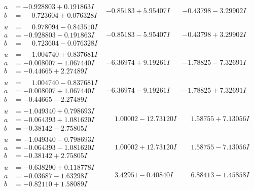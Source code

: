 \documentclass[1p]{elsarticle_modified}
\theoremstyle{definition}
\begin{document}
$$\begin{array}{c|c|c}
\begin{aligned}
a &= -0.928803 + 0.191863 I \\
b &= \phantom{-}0.723604 + 0.076328 I\end{aligned}
 & -0.85183 + 5.95407 I & -0.43798 - 3.29902 I \\ \hline\begin{aligned}
u &= \phantom{-}0.978094 - 0.843510 I \\
a &= -0.928803 - 0.191863 I \\
b &= \phantom{-}0.723604 - 0.076328 I\end{aligned}
 & -0.85183 - 5.95407 I & -0.43798 + 3.29902 I \\ \hline\begin{aligned}
u &= \phantom{-}1.004740 + 0.837681 I \\
a &= -0.008007 - 1.067440 I \\
b &= -0.44665 + 2.27489 I\end{aligned}
 & -6.36974 + 9.19261 I & -1.78825 - 7.32691 I \\ \hline\begin{aligned}
u &= \phantom{-}1.004740 - 0.837681 I \\
a &= -0.008007 + 1.067440 I \\
b &= -0.44665 - 2.27489 I\end{aligned}
 & -6.36974 - 9.19261 I & -1.78825 + 7.32691 I \\ \hline\begin{aligned}
u &= -1.049340 + 0.798693 I \\
a &= -0.064393 + 1.081620 I \\
b &= -0.38142 - 2.75805 I\end{aligned}
 & \phantom{-}1.00002 - 12.73120 I & \phantom{-}1.58755 + 7.13056 I \\ \hline\begin{aligned}
u &= -1.049340 - 0.798693 I \\
a &= -0.064393 - 1.081620 I \\
b &= -0.38142 + 2.75805 I\end{aligned}
 & \phantom{-}1.00002 + 12.73120 I & \phantom{-}1.58755 - 7.13056 I \\ \hline\begin{aligned}
u &= -0.638290 + 0.118778 I \\
a &= -0.03687 - 1.63298 I \\
b &= -0.82110 + 1.58089 I\end{aligned}
 & \phantom{-}3.42951 - 0.40840 I & \phantom{-}6.88413 - 1.45858 I \\ \hline\begin{aligned}

\end{aligned}
\end{array}$$
\end{document}
